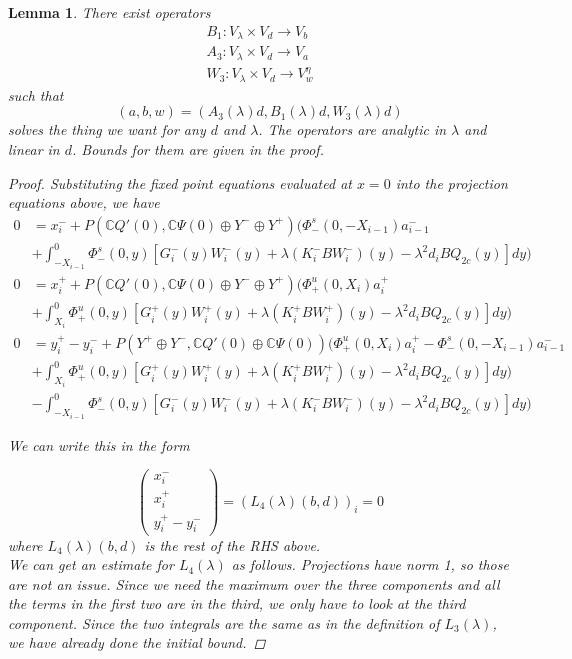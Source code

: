 \documentclass[12pt]{article}
\def\C{{\mathbb C}}
\newtheorem{lemma}{Lemma}
\begin{document}
\begin{lemma}
There exist operators 
\begin{align*}
B_1: V_\lambda \times V_d \rightarrow V_b \\
A_3: V_\lambda \times V_d \rightarrow V_a \\
W_3: V_\lambda \times V_d \rightarrow V_w^\eta
\end{align*}
such that 
\[
(a,b,w) = (A_3(\lambda)d, B_1(\lambda)d, W_3(\lambda)d)
\]
solves the thing we want for any $d$ and $\lambda$. The operators are analytic in $\lambda$ and linear in $d$. Bounds for them are given in the proof.

\begin{proof}
Substituting the fixed point equations evaluated at $x = 0$ into the projection equations above, we have 
\begin{align*}
0 &= x_i^- + P(\C Q'(0), \C\Psi(0) \oplus Y^- \oplus Y^+) \Big( \Phi^s_-(0, -X_{i-1})a^-_{i-1}  \\
&+ \int_{-X_{i-1}}^0 \Phi^s_-(0, y)[G_i^-(y) W_i^-(y) + \lambda (K_i^-B W_i^-)(y) - \lambda^2 d_i B Q_{2c}(y) ] dy \Big) \\
0 &= x_i^+ + P(\C Q'(0), \C\Psi(0) \oplus Y^- \oplus Y^+) \Big( \Phi^u_+(0, X_i)a^+_{i} \\
&+ \int_{X_{i}}^0 \Phi^u_+(0, y)[G_i^+(y) W_i^+(y) + \lambda (K_i^+ B W_i^+)(y) - \lambda^2 d_i B Q_{2c}(y) ] dy \Big)\\
0 &= y_i^+ - y_i^- + P(Y^+ \oplus Y^-, \C Q'(0) \oplus \C\Psi(0) )\Big( \Phi^u_+(0, X_i)a^+_{i} - \Phi^s_-(0, -X_{i-1})a^-_{i-1} \\
&+ \int_{X_{i}}^0 \Phi^u_+(0, y)[G_i^+(y) W_i^+(y) + \lambda (K_i^+ B W_i^+)(y) - \lambda^2 d_i B Q_{2c}(y) ] dy \Big)\\
&- \int_{-X_{i-1}}^0 \Phi^s_-(0, y)[G_i^-(y) W_i^-(y) + \lambda (K_i^-B W_i^-)(y) - \lambda^2 d_i B Q_{2c}(y) ] dy \Big)
\end{align*}

We can write this in the form

\[ 
\begin{pmatrix}x_i^- \\ x_i^+ \\ y_i^+ - y_i^- \end{pmatrix} = (L_4(\lambda)(b,d))_i = 0
\]
where $L_4(\lambda)(b,d)$ is the rest of the RHS above.\\

We can get an estimate for $L_4(\lambda)$ as follows. Projections have norm 1, so those are not an issue. Since we need the maximum over the three components and all the terms in the first two are in the third, we only have to look at the third component. Since the two integrals are the same as in the definition of $L_3(\lambda)$, we have already done the initial bound.


\end{proof}
\end{lemma}
\end{document}
